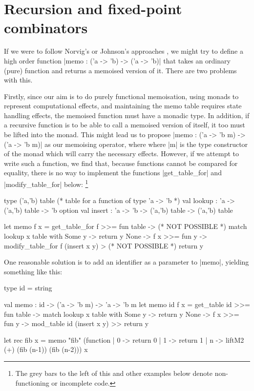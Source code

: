 \section{Recursion and fixed-point combinators}
\label{s:recursion}

If we were to follow Norvig's or Johnson's approaches \cite{Norvig1991,Johnson1995},
we might try to define a high order function |memo : ('a -> 'b) -> ('a -> 'b)| that
takes an ordinary (pure) function and returns a memoised version of it. There are two
problems with this. 

Firstly, since our aim is to do purely functional memoisation, using monads to
represent computational effects, and maintaining the memo table requires state
handling effects, the memoised function must have a monadic type. In addition,
if a recursive function is to be able to call a memoised version of itself, it too
must be lifted into the monad.
This might lead us to propose 
|memo : ('a -> 'b m) -> ('a -> 'b m)| as our memoising operator, where 
where |m| is the type constructor of the monad which will carry the necessary effects.
However, if we attempt to write such a function, we find that, because functions cannot
be compared for equality, there is no way to 
implement the functions |get_table_for| and |modify_table_for| below:%
\footnote{The
grey bars to the left of this and other examples below denote non-functioning or incomplete code.}
\begin{badocaml}
	type ('a,'b) table  (* table for a function of type 'a -> 'b *)
	val lookup : 'a -> ('a,'b) table -> 'b option
	val insert : 'a -> 'b -> ('a,'b) table -> ('a,'b) table

	let memo f x = 
		get_table_for f >>= fun table -> (* NOT POSSIBLE *)
		match lookup x table with
		Some y -> return y
		None -> f x >>= fun y ->
			      modify_table_for f (insert x y) > (* NOT POSSIBLE *)
			      return y 
\end{badocaml}
One reasonable solution is to add an identifier
as a parameter to |memo|, yielding something like this:
\begin{badocaml}
	type id = string

	val memo : id -> ('a -> 'b m) -> 'a -> 'b m
	let memo id f x =  
		get_table id >>= fun table ->
		match lookup x table  with
		Some y -> return y
		None -> f x >>= fun y ->
			      mod_table id (insert x y) >>
			      return y 

	let rec fib x = 
		memo "fib" (function 
								| 0 -> return 0 
								| 1 -> return 1 
								| n -> liftM2 (+) (fib (n-1)) (fib (n-2))) x
\end{badocaml}
